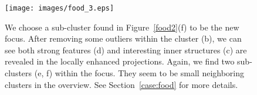 \begin{figure}[htbp]
\centering
  \texttt{[image: images/food\_3.eps]}%
  \caption{We choose a sub-cluster found in Figure~\ref{food2}(f) to be the new focus. After removing some outliers within the cluster (b), we can see both strong features (d) and interesting inner structures (c) are revealed in the locally enhanced projections. Again, we find two sub-clusters (e, f) within the focus. They seem to be small neighboring clusters in the overview. See Section~\ref{case:food} for more details.}
\label{fig:food3}
  \end{figure}


